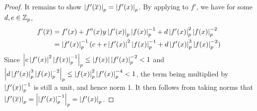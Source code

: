 \begin{proof}
  It remains to show $\abs{f'(\bar{x})}_p = \abs{f'(x)}_p$. 
  By applying  to $f'$, 
  we have for some $d, e \in \Z_p$, \begin{align*}
    f'(\bar{x})
    &= f'(x) + f''(x) y \abs{f'(x)}_p\abs{f(x)}_p\inv 
    + d  \abs{f'(x)}_p^2 \abs{f(x)}_p^{-2} \\
    &= \abs{f'(x)}_p\inv (c + e \abs{f'(x)}^2\abs{f(x)}_p\inv 
    + d \abs{f'(x)}_p^3 \abs{f(x)}_p^{-2}) 
  \end{align*}
  Since $\abs{e \abs{f'(x)}^2\abs{f(x)}_p\inv}_p \leq 
  \abs{f(x)}\abs{f'(x)}_p^{-2} < 1$ and 
  $\abs{d \abs{f'(x)}_p^3 \abs{f(x)}_p^{-2}}_p \leq 
  \abs{f(x)}_p^{2} \abs{f'(x)}_p^{-4} < 1$,
  the term being multiplied by $\abs{f'(x)}_p\inv$ is still a unit, 
  and hence norm $1$. 
  It then follows from taking norms that 
  $\abs{f'(\bar{x})}_p = \abs{\abs{f'(x)}_p\inv}_p = \abs{f'(x)}_p$.
\end{proof}

